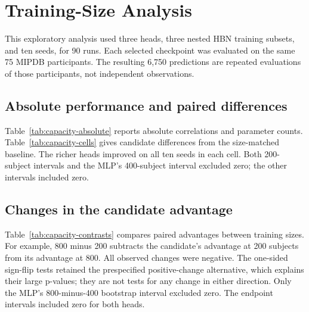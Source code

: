 \section{Training-Size Analysis}
\label{sec:capacity}

This exploratory analysis used three heads, three nested HBN training subsets,
and ten seeds, for 90 runs. Each selected checkpoint was evaluated on the same
75 MIPDB participants. The resulting 6,750 predictions are repeated evaluations
of those participants, not independent observations.

\subsection{Absolute performance and paired differences}
Table~\ref{tab:capacity-absolute} reports absolute correlations and parameter
counts. Table~\ref{tab:capacity-cells} gives candidate differences from the
size-matched baseline. The richer heads improved on all ten seeds in each cell.
Both 200-subject intervals and the MLP's 400-subject interval excluded zero;
the other intervals included zero.

\begin{table}[!htbp]
  \centering
  \small
  \caption{MIPDB correlations by HBN training size. SD is computed across ten
  seeds. The MLP has four hidden units.}
  \label{tab:capacity-absolute}
  
\end{table}

\begin{table}[!htbp]
  \centering
  \small
  \caption{Paired candidate differences at each training size. W/T/L counts
  positive, zero, and negative seed differences. Intervals resample seeds and
  participants; p-values are exploratory.}
  \label{tab:capacity-cells}
  
\end{table}

\subsection{Changes in the candidate advantage}
Table~\ref{tab:capacity-contrasts} compares paired advantages between training
sizes. For example, 800 minus 200 subtracts the candidate's advantage at 200
subjects from its advantage at 800. All observed changes were negative. The
one-sided sign-flip tests retained the prespecified positive-change alternative,
which explains their large p-values; they are not tests for any change in
either direction. Only the MLP's 800-minus-400 bootstrap interval excluded zero.
The endpoint intervals included zero for both heads.

